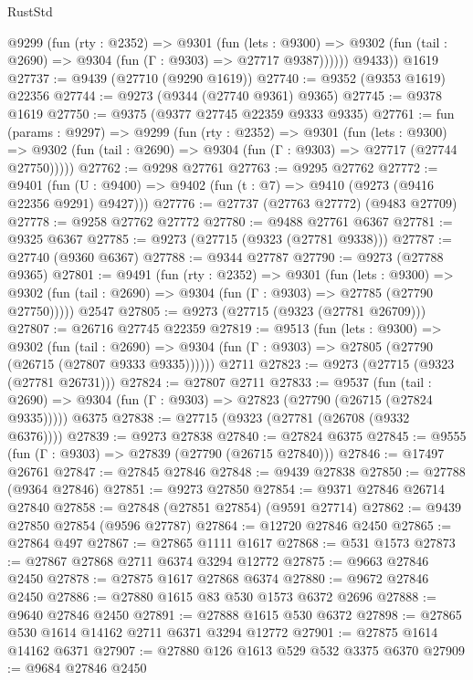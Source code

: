 \begin{lexlean}{RustStd}
\begin{coremodule}
          @9299
            (fun (rty : @2352) =>
            @9301
              (fun (lets : @9300) =>
              @9302 (fun (tail : @2690) => @9304 (fun (Γ : @9303) => @27717 @9387))))))
        @9433))
    @1619
@27737 := @9439 (@27710 (@9290 @1619))
@27740 := @9352 (@9353 @1619) @22356
@27744 := @9273 (@9344 (@27740 @9361) @9365)
@27745 := @9378 @1619
@27750 := @9375 (@9377 @27745 @22359 @9333 @9335)
@27761 := fun (params : @9297) =>
  @9299
    (fun (rty : @2352) =>
    @9301
      (fun (lets : @9300) =>
      @9302 (fun (tail : @2690) => @9304 (fun (Γ : @9303) => @27717 (@27744 @27750)))))
@27762 := @9298 @27761
@27763 := @9295 @27762
@27772 := @9401
    (fun (U : @9400) => @9402 (fun (t : @7) => @9410 (@9273 (@9416 @22356 @9291) @9427)))
@27776 := @27737 (@27763 @27772) (@9483 @27709)
@27778 := @9258 @27762 @27772
@27780 := @9488 @27761 @6367
@27781 := @9325 @6367
@27785 := @9273 (@27715 (@9323 (@27781 @9338)))
@27787 := @27740 (@9360 @6367)
@27788 := @9344 @27787
@27790 := @9273 (@27788 @9365)
@27801 := @9491
    (fun (rty : @2352) =>
    @9301
      (fun (lets : @9300) =>
      @9302 (fun (tail : @2690) => @9304 (fun (Γ : @9303) => @27785 (@27790 @27750)))))
    @2547
@27805 := @9273 (@27715 (@9323 (@27781 @26709)))
@27807 := @26716 @27745 @22359
@27819 := @9513
    (fun (lets : @9300) =>
    @9302
      (fun (tail : @2690) =>
      @9304 (fun (Γ : @9303) => @27805 (@27790 (@26715 (@27807 @9333 @9335))))))
    @2711
@27823 := @9273 (@27715 (@9323 (@27781 @26731)))
@27824 := @27807 @2711
@27833 := @9537
    (fun (tail : @2690) => @9304 (fun (Γ : @9303) => @27823 (@27790 (@26715 (@27824 @9335)))))
    @6375
@27838 := @27715 (@9323 (@27781 (@26708 (@9332 @6376))))
@27839 := @9273 @27838
@27840 := @27824 @6375
@27845 := @9555 (fun (Γ : @9303) => @27839 (@27790 (@26715 @27840)))
@27846 := @17497 @26761
@27847 := @27845 @27846
@27848 := @9439 @27838
@27850 := @27788 (@9364 @27846)
@27851 := @9273 @27850
@27854 := @9371 @27846 @26714 @27840
@27858 := @27848 (@27851 @27854) (@9591 @27714)
@27862 := @9439 @27850 @27854 (@9596 @27787)
@27864 := @12720 @27846 @2450
@27865 := @27864 @497
@27867 := @27865 @1111 @1617
@27868 := @531 @1573
@27873 := @27867 @27868 @2711 @6374 @3294 @12772
@27875 := @9663 @27846 @2450
@27878 := @27875 @1617 @27868 @6374
@27880 := @9672 @27846 @2450
@27886 := @27880 @1615 @83 @530 @1573 @6372 @2696
@27888 := @9640 @27846 @2450
@27891 := @27888 @1615 @530 @6372
@27898 := @27865 @530 @1614 @14162 @2711 @6371 @3294 @12772
@27901 := @27875 @1614 @14162 @6371
@27907 := @27880 @126 @1613 @529 @532 @3375 @6370
@27909 := @9684 @27846 @2450

\end{coremodule}
\end{lexlean}
